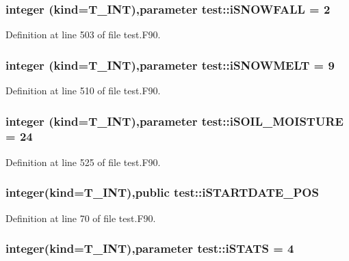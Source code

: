 \hypertarget{namespacetest_a406398e83d202c4d496adcc1af5d6fb3}{
\subsubsection[{iSNOWFALL}]{\setlength{\rightskip}{0pt plus 5cm}integer (kind={\bf T\_\-INT}),parameter {\bf test::iSNOWFALL} = 2}}
\label{namespacetest_a406398e83d202c4d496adcc1af5d6fb3}


Definition at line 503 of file test.F90.

\hypertarget{namespacetest_a0d778816066d21ff37157e9e33ffa64d}{
\subsubsection[{iSNOWMELT}]{\setlength{\rightskip}{0pt plus 5cm}integer (kind={\bf T\_\-INT}),parameter {\bf test::iSNOWMELT} = 9}}
\label{namespacetest_a0d778816066d21ff37157e9e33ffa64d}


Definition at line 510 of file test.F90.

\hypertarget{namespacetest_af695837c4d2bfcaa32ecc407aad09776}{
\subsubsection[{iSOIL\_\-MOISTURE}]{\setlength{\rightskip}{0pt plus 5cm}integer (kind={\bf T\_\-INT}),parameter {\bf test::iSOIL\_\-MOISTURE} = 24}}
\label{namespacetest_af695837c4d2bfcaa32ecc407aad09776}


Definition at line 525 of file test.F90.

\hypertarget{namespacetest_ac53c64b203e8d99ae558218e98beef9d}{
\subsubsection[{iSTARTDATE\_\-POS}]{\setlength{\rightskip}{0pt plus 5cm}integer(kind={\bf T\_\-INT}),public {\bf test::iSTARTDATE\_\-POS}}}
\label{namespacetest_ac53c64b203e8d99ae558218e98beef9d}


Definition at line 70 of file test.F90.

\hypertarget{namespacetest_a4ee9e6e104ab7138d29b46b35a43f499}{
\subsubsection[{iSTATS}]{\setlength{\rightskip}{0pt plus 5cm}integer(kind={\bf T\_\-INT}),parameter {\bf test::iSTATS} = 4}}
\label{namespacetest_a4ee9e6e104ab7138d29b46b35a43f499}



